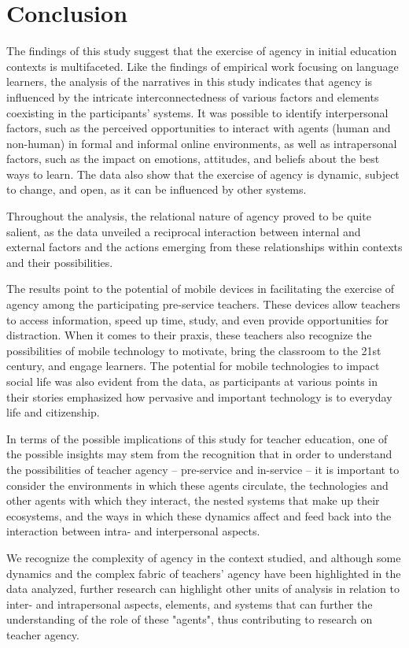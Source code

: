 \section{Conclusion}\label{sec-conclusion}

The findings of this study suggest that the exercise of agency in initial education contexts is multifaceted. Like the findings of  empirical work focusing on language learners, the analysis of the narratives in this study indicates that agency is influenced by the intricate interconnectedness of various factors and elements coexisting in the participants' systems. It was possible to identify interpersonal factors, such as the perceived opportunities to interact with agents (human and non-human) in formal and informal online environments, as well as intrapersonal factors, such as the impact on emotions, attitudes, and beliefs about the best ways to learn. The data also show that the exercise of agency is dynamic, subject to change, and open, as it can be influenced by other systems.

Throughout the analysis, the relational nature of agency \cite{larsen2019} proved to be quite salient, as the data unveiled a reciprocal interaction between internal and external factors and the actions emerging from these relationships within contexts and their possibilities.

The results point to the potential of mobile devices in facilitating the exercise of agency among the participating pre-service teachers. These devices allow teachers to access information, speed up time, study, and even provide opportunities for distraction. When it comes to their praxis, these teachers also recognize the possibilities of mobile technology to motivate, bring the classroom to the 21st century, and engage learners. The potential for mobile technologies to impact social life was also evident from the data, as participants at various points in their stories emphasized how pervasive and important technology is to everyday life and citizenship.

In terms of the possible implications of this study for teacher education, one of the possible insights may stem from the recognition that in order to understand the possibilities of teacher agency – pre-service and in-service – it is important to consider the environments in which these agents circulate, the technologies and other agents with which they interact, the nested systems that make up their ecosystems, and the ways in which these dynamics affect and feed back into the interaction between intra- and interpersonal aspects.

We recognize the complexity of agency in the context studied, and although some dynamics and the complex fabric of teachers' agency have been highlighted in the data analyzed, further research can highlight other units of analysis in relation to inter- and intrapersonal aspects, elements, and systems that can further the understanding of the role of these "agents", thus contributing to research on teacher agency.